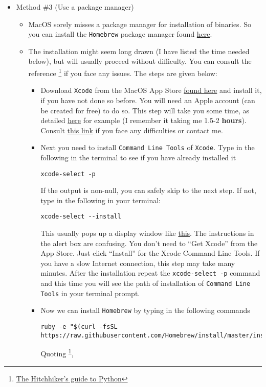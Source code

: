 \documentclass[11pt]{article}
\begin{document}
\begin{itemize}
\item Method \#3 (Use a package manager)
\label{sec:org8cf0c2d}
\begin{itemize}
\item MacOS sorely misses a package manager for installation of binaries. So you
can install the \texttt{Homebrew} package manager found \href{https://brew.sh/}{here}.
\item The installation might seem long drawn (I have listed the time needed
below), but will usually proceed without difficulty. You can consult the
reference \footnote{\href{https://docs.python-guide.org/starting/install3/osx/}{The Hitchhiker's guide to Python}\label{org0adc07e}} if you face any issues. The steps are given below:
\begin{itemize}
\item Download \texttt{Xcode} from the MacOS App Store \href{https://developer.apple.com/xcode/}{found here} and install it, if you have not
done so before. You will need an Apple account (can be created for free) to do so. This step will take you some time, as
detailed \href{https://stackoverflow.com/questions/32701043/how-long-should-xcode-7-installation-take}{here} for example (I remember it taking me 1.5-2 \textbf{hours}).
Consult \href{https://medium.com/@LondonAppBrewery/how-to-download-and-setup-xcode-10-for-ios-development-b63bed1865c}{this link} if you face any difficulties or contact me.
\item Next you need to install \texttt{Command Line Tools} of \texttt{Xcode}. Type in the
following in the terminal to see if you have already installed it
\begin{verbatim}
xcode-select -p
\end{verbatim}
If the output is non-null, you can safely skip to the next step. If not,
type in the following in your terminal:
\begin{verbatim}
xcode-select --install
\end{verbatim}
This usually pops up a display window like \href{https://railsapps.github.io/images/installing-mavericks-popup.png}{this}. The instructions in the
alert box are confusing. You don’t need to ``Get Xcode'' from the App
Store. Just click ``Install'' for the Xcode Command Line Tools. If you have
a slow Internet connection, this step may take many minutes. After the
installation repeat the \texttt{xcode-select -p}  command and this time you will
see the path of installation of \texttt{Command Line Tools} in your terminal prompt.
\item Now we can install \texttt{Homebrew} by typing in the following commands
\begin{verbatim}
ruby -e "$(curl -fsSL https://raw.githubusercontent.com/Homebrew/install/master/install)"
\end{verbatim}
Quoting \textsuperscript{\ref{org0adc07e}},


\end{itemize}
\end{itemize}
\end{itemize}
\end{document}
